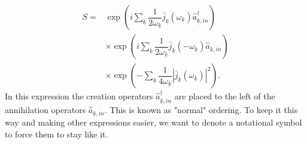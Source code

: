 \documentclass[12pt, titlepage]{article}
\begin{document}
\begin{equation}\label{S_for_probability}
\begin{split}
S=&	
\exp
    \left(
       i
    \sum_{\underline{k}}
     	\dfrac{1}{2\omega_{\underline{k}}}
     	 \bar{j}_{\underline{k}}(\omega_{\underline{k}})
			\hat{a}^{\dagger}_{\underline{k},in}     
    \right)
	\\
&
    \times
        \exp
    \left(
     	  i
    	\sum_{\underline{k}}
     	\dfrac{1}{2\omega_{\underline{k}}}
      \bar{j}_{\underline{k}}(-\omega_{\underline{k}})
			\hat{a}_{\underline{k},in}  		
    \right)
    	\\
&
  \times \exp
    \left(
       -
    \sum_{\underline{k}}
     	\dfrac{1}{4\omega_{\underline{k}}}
    	| \bar{j}_{\underline{k}}(\omega_{\underline{k}})|^2
    \right)	
	.
\end{split}
\end{equation}
In this expression the creation operators $ \hat{a}^{\dagger}_{\underline{k},in} $ are placed to the left of the annihilation operators $ \hat{a}_{\underline{k},in} $. This is known as "normal" ordering. To keep it this way and making other expressions easier, we want to denote a notational symbol to force them to stay like it.
\end{document}
